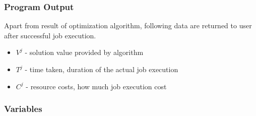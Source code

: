 \subsubsection{Program Output}
Apart from result of optimization algorithm,
following data are returned to user after successful job execution.

\begin{itemize}
    \item $V^{j}$ - solution value provided by algorithm
    \item $T^{j}$ - time taken, duration of the actual job execution
    \item $C^{j}$ - resource costs, how much job execution cost
\end{itemize}

\subsubsection{Variables}

